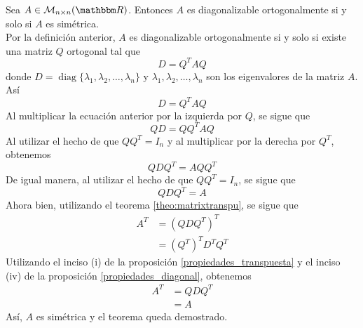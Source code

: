 \begin{theorem}\label{theorem_simetrica3}
    Sea $A \in \mathcal{M}_{n \times n}(\RR)$. Entonces $A$ es diagonalizable ortogonalmente si y solo si $A$ es simétrica. \\
    \demostracion Por la definición anterior, $A$ es diagonalizable ortogonalmente si y solo si existe una matriz $Q$ ortogonal tal que
    $$D = Q^{T}AQ$$
    donde $D = \operatorname{diag} \{ \lambda_1, \lambda_2, \dots, \lambda_n \}$ y $\lambda_1, \lambda_2, \dots, \lambda_n$ son los eigenvalores de la matriz $A$. Así
    $$D = Q^{T}AQ$$
    Al multiplicar la ecuación anterior por la izquierda por $Q$, se sigue que
    $$QD = QQ^{T}AQ$$
    Al utilizar el hecho de que $QQ^{T} = I_n$ y al multiplicar por la derecha por $Q^{T}$, obtenemos
    $$QDQ^{T} = AQQ^{T}$$
    De igual manera, al utilizar el hecho de que $QQ^{T} = I_n$, se sigue que
    $$QDQ^{T} = A$$
    Ahora bien, utilizando el teorema \ref{theo:matrixtranspu}, se sigue que
    \begin{align*}
        A^{T} & = \left( QDQ^{T} \right)^{T} \\
        & = \left( Q^{T} \right)^{T} D^{T} Q^{T}
    \end{align*}
    Utilizando el inciso (i) de la proposición \ref{propiedades_transpuesta} y el inciso (iv) de la proposición \ref{propiedades_diagonal}, obtenemos
    \begin{align*}
        A^T & = QDQ^{T} \\
        & = A
    \end{align*}
    Así, $A$ es simétrica y el teorema queda demostrado.
\end{theorem}

